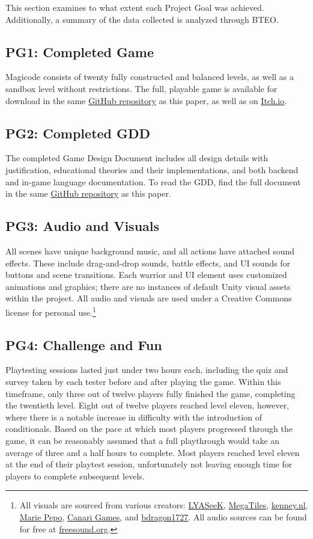 \documentclass[10pt,twocolumn]{article}
\begin{document}
This section examines to what extent each Project Goal was achieved. Additionally, a summary of the data collected is analyzed through BTEO.

\subsection{PG1: Completed Game}
Magicode consists of twenty fully constructed and balanced levels, as well as a sandbox level without restrictions. The full, playable game is available for download in the same \href{https://github.com/slevy14/Comps-Game}{GitHub repository} as this paper, as well as on \href{https://leafguy.itch.io/magicode}{Itch.io}.

\subsection{PG2: Completed GDD}
The completed Game Design Document includes all design details with justification, educational theories and their implementations, and both backend and in-game language documentation. To read the GDD, find the full document in the same \href{https://github.com/slevy14/Comps-Game}{GitHub repository} as this paper.

\subsection{PG3: Audio and Visuals}
All scenes have unique background music, and all actions have attached sound effects. These include drag-and-drop sounds, battle effects, and UI sounds for buttons and scene transitions. Each warrior and UI element uses customized animations and graphics; there are no instances of default Unity visual assets within the project. All audio and visuals are used under a Creative Commons license for personal use.\footnote{All visuals are sourced from various creators: \href{https://lyaseek.itch.io/}{LYASeeK}, \href{https://megatiles.itch.io/}{MegaTiles}, \href{http://kenney.nl}{kenney.nl}, \href{https://marie-pepo.itch.io/mf-items}{Marie Pepo}, \href{https://canarigames.itch.io/canaripack-8bit-topdown}{Canari Games}, and \href{https://bdragon1727.itch.io/basic-pixel-health-bar-and-scroll-bar}{bdragon1727}. All audio sources can be found for free at \href{https://freesound.org/}{freesound.org}.}

\subsection{PG4: Challenge and Fun}
Playtesting sessions lasted just under two hours each, including the quiz and survey taken by each tester before and after playing the game. Within this timeframe, only three out of twelve players fully finished the game, completing the twentieth level. Eight out of twelve players reached level eleven, however, where there is a notable increase in difficulty with the introduction of conditionals. Based on the pace at which most players progressed through the game, it can be reasonably assumed that a full playthrough would take an average of three and a half hours to complete. Most players reached level eleven at the end of their playtest session, unfortunately not leaving enough time for players to complete subsequent levels.
\end{document}
